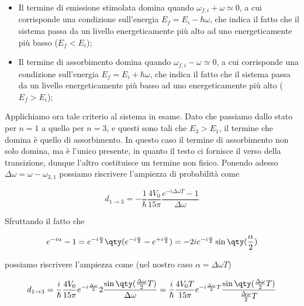 \begin{soluzione}
   \begin{itemize}[leftmargin=0.5cm]
      \item Il termine di emissione stimolata domina quando $\omega_{f,i} + \omega \simeq0$, a cui corrisponde una condizione sull'energia $E_f=E_i - \hbar \omega$, che indica il fatto che il sistema passa da un livello energeticamente più alto ad uno energeticamente più basso ($E_f < E_i$);
      \item Il termine di assorbimento domina quando $\omega_{f,i} - \omega \simeq0$, a cui corrisponde una condizione sull'energia $E_f=E_i + \hbar \omega$, che indica il fatto che il sistema passa da un livello energeticamente più basso ad uno energeticamente più alto ($E_f > E_i$);
   \end{itemize}

   Applichiamo ora tale criterio al sistema in esame. Dato che passiamo dallo stato per $n=1$ a quello per $n=3$, e questi sono tali che $E_3 > E_1$, il termine che domina è quello di assorbimento. In questo caso il termine di assorbimento non solo domina, ma è l'unico presente, in quanto il testo ci fornisce il verso della transizione, dunque l'altro costituisce un termine non fisico. Ponendo adesso $\Delta \omega=\omega - \omega_{3,1}$ possiamo riscrivere l'ampiezza di probabilità come

   \begin{equation*}
      d_{1 \to 3}
      =-\frac{1}{\hbar} \frac{4 V_0}{15 \pi} \frac{e^{-i \Delta \omega T} - 1}{\Delta \omega}
   \end{equation*}

   Sfruttando il fatto che
   
   \begin{equation*}
      e^{-i\alpha} - 1
      =e^{-i\frac{\alpha}{2}} \qty( e^{-i\frac{\alpha}{2}} - e^{+i\frac{\alpha}{2}} )
      =-2i e^{-i\frac{\alpha}{2}} \sin{\qty( \frac{\alpha}{2} )}
   \end{equation*}

   possiamo riscrivere l'ampiezza come (nel nostro caso $\alpha=\Delta\omega T$)

   \begin{equation*}
      d_{1 \to 3}
      =\frac{i}{\hbar} \frac{4 V_0}{15 \pi} e^{-i \frac{\Delta \omega}{2} } 2 \frac{ \sin{ \qty( \frac{\Delta \omega}{2} T ) } }{ \Delta \omega }
      =\frac{i}{\hbar} \frac{4 V_0 T}{15 \pi} e^{-i \frac{\Delta \omega}{2} T} \frac{ \sin{ \qty( \frac{\Delta \omega}{2} T ) } }{\frac{\Delta \omega}{2} T}
   \end{equation*}
   

\end{soluzione}
